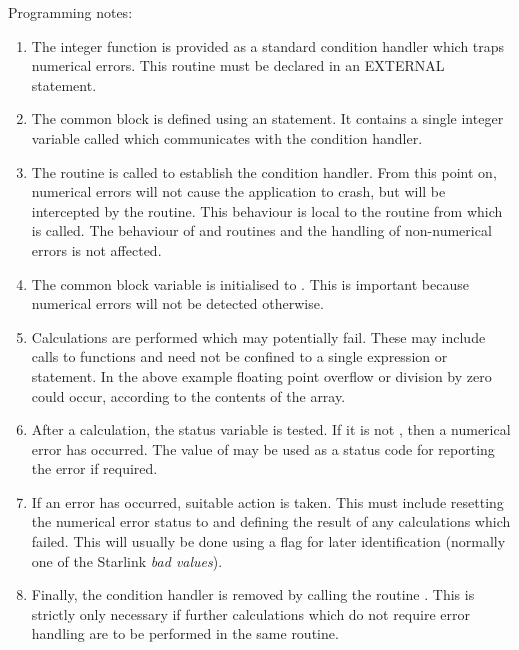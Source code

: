 Programming notes:

\begin{enumerate}

\item The integer function  is provided as a standard
condition handler which traps numerical errors. 
This routine must be declared in an EXTERNAL statement.

\item The common block  is defined using an 
statement.
It contains a single integer variable called  which
communicates with the condition handler. 

\item The   routine  is called to
establish the condition handler.
From this point on, numerical errors will not cause the application to
crash, but will be intercepted by the  routine. 
This behaviour is local to the routine from which  is
called.
The behaviour of  and  routines and the handling of
non-numerical errors is not affected. 

\item The common block variable  is initialised to
. 
This is important because numerical errors will not be detected otherwise.

\item Calculations are performed which may potentially fail.  These may
include calls to  functions and need not be confined to a single
expression or statement. 
In the above example floating point overflow or division by zero could
occur, according to the contents of the  array. 

\item  After a calculation, the status variable  is tested.
If it is not , then a numerical error has occurred. 
The value of  may be used as a status code for reporting
the error if required. 

\item  If an error has occurred, suitable action is taken.
This must include resetting the numerical error status  to 
 and defining the result of any calculations which failed.
This will usually be done using a flag for later identification (normally
one of the Starlink {\em bad values}). 

\item Finally, the condition handler is removed by calling the 
routine .  This is strictly only necessary if further
calculations which do not require error handling are to be performed in the
same routine. 

\end{enumerate}

